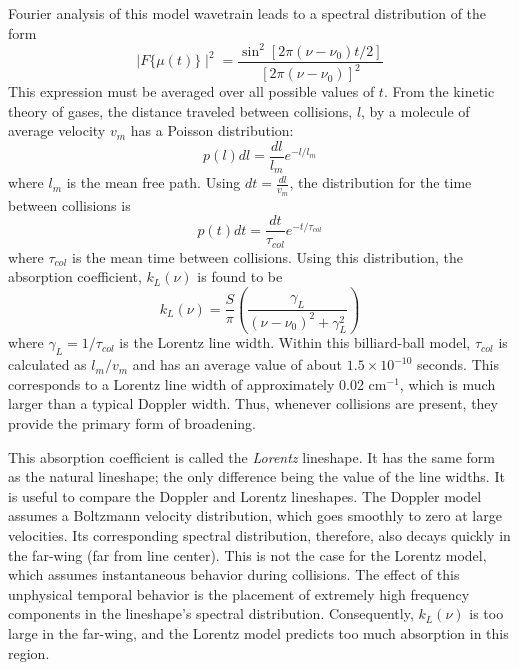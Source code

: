 \documentclass[11pt]{article}
\begin{document}
Fourier analysis of this model wavetrain leads to a spectral distribution of
the form
\begin{equation}
\mid {F}\{\mu(t)\} \mid^{2}= \frac{\sin^{2}
  [2\pi(\nu-\nu_{0})t/2]}{[2\pi(\nu-\nu_{0})]^{2}}
\end{equation}
This expression must be averaged over all possible values of $t$.
From the kinetic theory of gases, the distance traveled between collisions, 
$l$, by a molecule of average velocity $v_{m}$ has a Poisson distribution:
\begin{equation}
 p(l)dl=\frac{dl}{l_{m}}e^{-l/l_{m}}
\end{equation}
where $l_{m}$ is the mean free path.  Using $dt=\frac{dl}{v_{m}}$, the
distribution for the time between collisions is
\begin{equation}
 p(t)dt=\frac{dt}{\tau_{col}}e^{-t/\tau_{col}}
\end{equation}
where $\tau_{col}$ is the mean time between collisions.  Using this
distribution, the absorption coefficient, $k_{L}(\nu)$ is found to be
\begin{equation}
 k_{L}(\nu)=\frac{S}{\pi}\left(\frac{\gamma_{L}}
{(\nu-\nu_{0})^{2}+\gamma_{L}^{2}}\right)
\end{equation}
where $\gamma_{L}=1/\tau_{col}$ is the Lorentz line width.  Within this
billiard-ball model, $\tau_{col}$ is calculated as $l_{m}/v_{m}$ and has 
an average value of about $1.5 \times 10^{-10}$ seconds\cite{bre:56}.
This corresponds to a Lorentz line width of approximately 0.02 cm$^{-1}$, 
which is much larger than a typical Doppler width.  Thus, whenever 
collisions are present, they provide the primary form of broadening.  

This absorption coefficient is called the {\it Lorentz} 
lineshape.  It has the same form as the natural lineshape; the only
difference being the value of the line widths.  It is useful to compare 
the Doppler and Lorentz lineshapes.  The Doppler model assumes a Boltzmann 
velocity distribution, which goes smoothly to zero at large velocities.  Its
corresponding spectral distribution, therefore, also decays quickly in the 
far-wing (far from line center).  This is not the case for the Lorentz
model, which assumes instantaneous behavior during collisions.  The effect
of this unphysical temporal behavior is the placement of extremely high
frequency components in the lineshape's spectral distribution.
Consequently, $k_{L}(\nu)$ is too large in the far-wing, and the Lorentz
model predicts too much absorption in this region.
\end{document}
